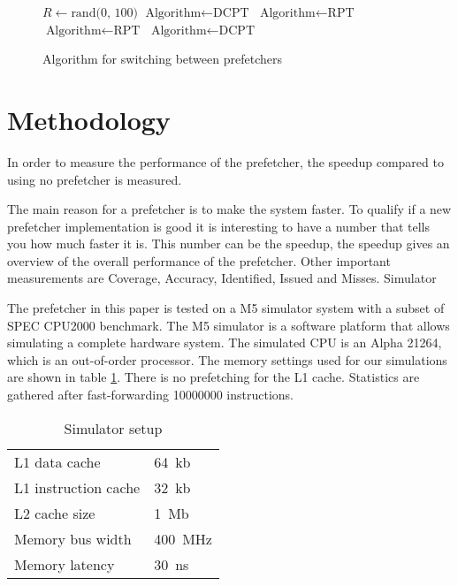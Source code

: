 \documentclass[journal,a4paper]{IEEEtran}
\begin{document}
\begin{figure}[!h]
	\caption{Algorithm for switching between prefetchers}
	\label{fig:switching}
	\centering

	\begin{algorithmic}[1]
		\STATE $R \leftarrow \textrm{rand(0, 100)}$
				\STATE $\textrm{Algorithm} \leftarrow \textrm{DCPT}$
			\ELSE
				\STATE $\textrm{Algorithm} \leftarrow \textrm{RPT}$
			\ENDIF
				\STATE $\textrm{Algorithm} \leftarrow \textrm{RPT}$
			\ELSE
				\STATE $\textrm{Algorithm} \leftarrow \textrm{DCPT}$
			\ENDIF
		\ENDIF
	\end{algorithmic}
\end{figure}

\section{Methodology}

In order to measure the performance of the prefetcher, the speedup compared to
using no prefetcher is measured.

The main reason for a prefetcher is to make the system faster. To qualify if a
new prefetcher implementation is good it is interesting to have a number that
tells you how much faster it is. This number can be the speedup, the speedup
gives an overview of the overall performance of the prefetcher. Other important
measurements are Coverage, Accuracy, Identified, Issued and Misses. 
Simulator

The prefetcher in this paper is tested on a M5 simulator system with a subset of
SPEC CPU2000 benchmark. The M5 simulator is a software platform that allows
simulating a complete hardware system. The simulated CPU is an Alpha 21264, which
is an out-of-order processor. The memory settings used for our simulations are shown
in table \ref{tab:simsetup}. There is no prefetching for the L1 cache. Statistics
are gathered after fast-forwarding 10000000 instructions.

\begin{table}[h]
	\caption{Simulator setup\cite{userman}}
	\label{tab:simsetup}
	\centering

	\begin{tabular}{|l|l|}
		\hline
		L1 data cache & 64~kb \\
		L1 instruction cache & 32~kb \\
		L2 cache size & 1~Mb \\
		Memory bus width & 400~MHz \\
		Memory latency & 30~ns \\
		\hline
	\end{tabular}
\end{table}
\end{document}
